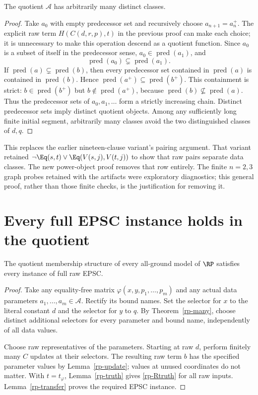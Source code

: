 \begin{theorem}\label{rp-many}
The quotient $\mathcal A$ has arbitrarily many distinct classes.
\end{theorem}
\begin{proof}
Take $a_0$ with empty predecessor set and recursively choose
$a_{n+1}=a_n^+$. The explicit raw term $H(C(d,r,p),t)$ in the previous
proof can make each choice; it is unnecessary to make this operation
descend as a quotient function. Since $a_0$ is a subset of itself in
the predecessor sense, $a_0\in\operatorname{pred}(a_1)$, and
\[
 \operatorname{pred}(a_0)\subsetneq\operatorname{pred}(a_1).
\]
If $\operatorname{pred}(a)\subsetneq\operatorname{pred}(b)$, then
every predecessor set contained in $\operatorname{pred}(a)$ is
contained in $\operatorname{pred}(b)$. Hence
$\operatorname{pred}(a^+)\subseteq\operatorname{pred}(b^+)$.
This containment is strict: $b\in\operatorname{pred}(b^+)$ but
$b\notin\operatorname{pred}(a^+)$, because
$\operatorname{pred}(b)\nsubseteq\operatorname{pred}(a)$.
Thus the predecessor sets of $a_0,a_1,\ldots$ form a strictly
increasing chain. Distinct predecessor sets imply distinct quotient
objects. Among any sufficiently long finite initial segment, arbitrarily
many classes avoid the two distinguished classes of $d,q$.
\end{proof}

This replaces the earlier nineteen-clause variant's pairing argument.
That variant retained
$\neg\Eq(s,t)\lor\Eq(V(s,j),V(t,j))$ to show that raw pairs
separate data classes. The new power-object proof removes that row
entirely. The finite $n=2,3$ graph probes retained with the artifacts
were exploratory diagnostics; this general proof, rather than those
finite checks, is the justification for removing it.

\section{Every full EPSC instance holds in the quotient}

\begin{theorem}\label{rp-lower}
The quotient membership structure of every all-ground model of $\RP$
satisfies every instance of full raw EPSC.
\end{theorem}
\begin{proof}
Take any equality-free matrix $\varphi(x,y,p_1,\ldots,p_m)$ and any
actual data parameters $a_1,\ldots,a_m\in\mathcal A$. Rectify its
bound names. Set the selector for $x$ to the literal constant $d$ and
the selector for $y$ to $q$. By Theorem~\ref{rp-many}, choose distinct
additional selectors for every parameter and bound name, independently
of all data values.

Choose raw representatives of the parameters. Starting at raw $d$,
perform finitely many $C$ updates at their selectors. The resulting
raw term $b$ has the specified parameter values by
Lemma~\ref{rp-update}; values at unused coordinates do not matter.
With $t=t_\varphi$, Lemma~\ref{rp-truth} gives
\eqref{rp-Rtruth} for all raw inputs. Lemma~\ref{rp-transfer} proves
the required EPSC instance.
\end{proof}

